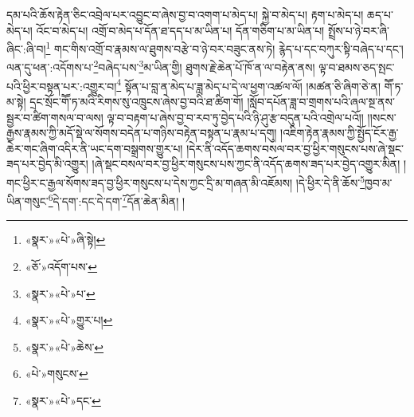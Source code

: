 དམ་པའི་ཆོས་རྟེན་ཅིང་འབྲེལ་པར་འབྱུང་བ་ཞེས་བྱ་བ་འགག་པ་མེད་པ། སྐྱེ་བ་མེད་པ། རྟག་པ་མེད་པ། ཆད་པ་མེད་པ། འོང་བ་མེད་པ། འགྲོ་བ་མེད་པ་དོན་ཐ་དད་པ་མ་ཡིན་པ། དོན་གཅིག་པ་མ་ཡིན་པ། སྤྲོས་པ་ཉེ་བར་ཞི་ཞིང་:ཞི་བ།\footnote{«སྣར་»«པེ་»ཞི་སྟེ།} གང་གིས་འགྲོ་བ་རྣམས་ལ་ཐུགས་བརྩེ་བ་ཉེ་བར་བཟུང་ནས་ཏེ། རྙེད་པ་དང་བཀུར་སྟི་བཞེད་པ་དང་། ལན་དུ་ཕན་:འདོགས་པ་\footnote{«ཅོ་»འདོག་པས་}བཞེད་པས་\footnote{«སྣར་»«པེ་»པ་}མ་ཡིན་གྱི། ཐུགས་རྗེ་ཆེན་པོ་ཁོ་ན་ལ་བརྟེན་ནས། ལྟ་བ་ཐམས་ཅད་སྤང་པའི་ཕྱིར་བསྟན་པར་:འགྱུར་བ།\footnote{«སྣར་»«པེ་»གྱུར་པ།} སྟོན་པ་བླ་ན་མེད་པ་ཟླ་མེད་པ་དེ་ལ་ཕྱག་འཚལ་ལོ། །མཚན་ཅི་ཞིག་ཅེ་ན། གཽ་ཏ་མ་སྟེ། དྲང་སྲོང་གཽ་ཏ་མའི་རིགས་སུ་འཁྲུངས་ཞེས་བྱ་བའི་ཐ་ཚིག་གོ། །སློབ་དཔོན་ཟླ་བ་གྲགས་པའི་ཞལ་སྔ་ནས་སྦྱར་བ་ཚིག་གསལ་བ་ལས། ལྟ་བ་བརྟག་པ་ཞེས་བྱ་བ་རབ་ཏུ་བྱེད་པའི་ཉི་ཤུ་རྩ་བདུན་པའི་འགྲེལ་པའོ།། །།སངས་རྒྱས་རྣམས་ཀྱི་མདོ་སྡེ་ལ་སོགས་བདེན་པ་གཉིས་བརྟེན་བསྟན་པ་རྣམ་པ་དགུ། །འཇིག་རྟེན་རྣམས་ཀྱི་སྤྱོད་ངོར་རྒྱ་ཆེར་གང་ཞིག་འདིར་ནི་ཡང་དག་བསྒྲགས་གྱུར་པ། །དེར་ནི་འདོད་ཆགས་བསལ་བར་བྱ་ཕྱིར་གསུངས་པས་ཞེ་སྡང་ཟད་པར་བྱེད་མི་འགྱུར། །ཞེ་སྡང་བསལ་བར་བྱ་ཕྱིར་གསུངས་པས་ཀྱང་ནི་འདོད་ཆགས་ཟད་པར་བྱེད་འགྱུར་མིན། །གང་ཕྱིར་ང་རྒྱལ་སོགས་ཟད་བྱ་ཕྱིར་གསུངས་པ་དེས་ཀྱང་དྲི་མ་གཞན་མི་འཇོམས། །དེ་ཕྱིར་དེ་ནི་ཆོས་\footnote{«སྣར་»«པེ་»ཆེས་}ཁྱབ་མ་ཡིན་གསུང་\footnote{«པེ་»གསུངས་}དེ་དག་:དང་དེ་དག་\footnote{«སྣར་»«པེ་»དང་}དོན་ཆེན་མིན། །
